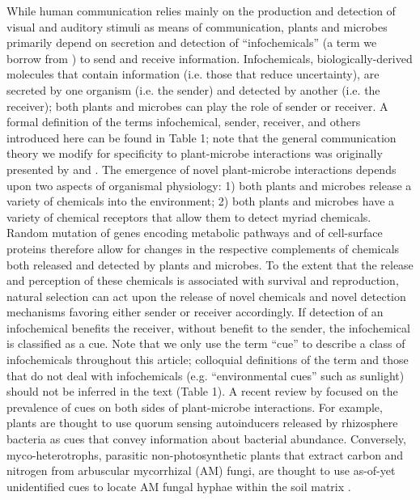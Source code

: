 While human communication relies mainly on the production and detection of visual and auditory stimuli as means of communication, plants and microbes primarily depend on secretion and detection of “infochemicals” (a term we borrow from \parencite{barto2012}) to send and receive information. Infochemicals, biologically-derived molecules that contain information (i.e. those that reduce uncertainty), are secreted by one organism (i.e. the sender) and detected by another (i.e. the receiver); both plants and microbes can play the role of sender or receiver. A formal definition of the terms infochemical, sender, receiver, and others introduced here can be found in Table 1; note that the general communication theory we modify for specificity to plant-microbe interactions was originally presented by \parencite{scott-phillips2008} and \parencite{scott-phillips2012}. The emergence of novel plant-microbe interactions depends upon two aspects of organismal physiology: 1) both plants and microbes release a variety of chemicals into the environment; 2) both plants and microbes have a variety of chemical receptors that allow them to detect myriad chemicals. Random mutation of genes encoding metabolic pathways and of cell-surface proteins therefore allow for changes in the respective complements of chemicals both released and detected by plants and microbes. To the extent that the release and perception of these chemicals is associated with survival and reproduction, natural selection can act upon the release of novel chemicals and novel detection mechanisms favoring either sender or receiver accordingly. 
If detection of an infochemical benefits the receiver, without benefit to the sender, the infochemical is classified as a cue. Note that we only use the term “cue” to describe a class of infochemicals throughout this article; colloquial definitions of the term and those that do not deal with infochemicals (e.g. “environmental cues” such as sunlight) should not be inferred in the text (Table 1). A recent review by \parencite{padje2016} focused on the prevalence of cues on both sides of plant-microbe interactions. For example, plants are thought to use quorum sensing autoinducers released by rhizosphere bacteria as cues that convey information about bacterial abundance. Conversely, myco-heterotrophs, parasitic non-photosynthetic plants that extract carbon and nitrogen from arbuscular mycorrhizal (AM) fungi, are thought to use as-of-yet unidentified cues to locate AM fungal hyphae within the soil matrix \parencite{rasmussen2015}. 	
